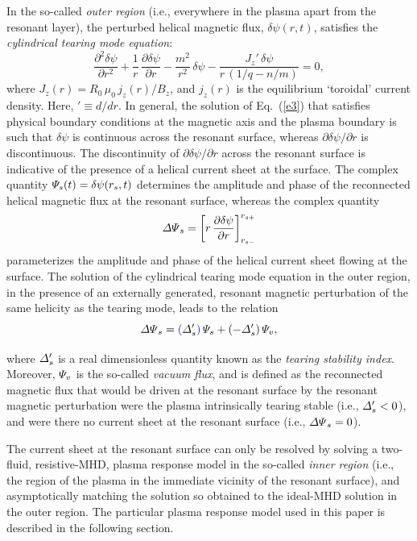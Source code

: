 \documentclass[12pt,prb,aps]{revtex4-1}
\providecommand{\DIFadd}[1]{{\protect\color{blue}\uwave{#1}}} %
\providecommand{\DIFaddbegin}{} %
\providecommand{\DIFaddend}{} %
\begin{document}
In the so-called {\em outer region}\/ (i.e., everywhere in the plasma
apart from the resonant layer), the perturbed helical magnetic flux, $\delta\psi(r,t)$, satisfies the
{\em cylindrical tearing mode equation}:\cite{wes}
\begin{equation}\label{e3}
\frac{\partial^2\delta\psi}{\partial r^2} + \frac{1}{r}\,\frac{\partial\delta\psi}{\partial r}-\frac{m^2}{r^2}\,\delta\psi - \frac{J_z'\,\delta\psi}{r\,(1/q-n/m)}=  0,
\end{equation}
where 
$J_z(r)= R_0\,\mu_0\,j_z(r)/B_z$,
and $j_z(r)$ is the equilibrium `toroidal' current density. Here, $'\equiv d/dr$. In general, the solution of Eq.~(\ref{e3}) that satisfies physical
boundary conditions at the magnetic axis and the plasma boundary is such that $\delta\psi$ is continuous
across the resonant surface, whereas $\partial\delta\psi/\partial r$ is discontinuous. The discontinuity of
 $\partial\delta\psi/\partial r$ across the resonant surface is indicative of the presence of a helical current
 sheet at the surface.  The complex quantity ${\mit\Psi}_s(t)= \delta\psi(r_s,t)$ determines the amplitude
 and phase of the reconnected helical magnetic flux at the resonant surface, whereas the complex quantity\,\cite{rf1993}
 \begin{equation}
{\mit\Delta\Psi}_s = \left[r\,\frac{\partial \delta\psi}{\partial r}\right]_{r_{s-}}^{r_{s+}}
\end{equation}
parameterizes the amplitude and phase of the helical current sheet flowing at the surface. The solution of
the cylindrical tearing mode equation in the outer region, in the presence of an externally generated, resonant magnetic perturbation 
of the same helicity as the tearing mode, leads to the relation\,\cite{rf1993,fkr}
\begin{equation}\label{e110}
{\mit\Delta\Psi}_s= \DIFaddbegin \DIFadd{(}\DIFaddend {\mit\Delta}_s'\DIFaddbegin \DIFadd{)}\DIFaddend \,{\mit\Psi}_s + (-{\mit\Delta}_s')\,{\mit\Psi}_v,
\end{equation}
where ${\mit\Delta}_s'$ is a real dimensionless quantity known as the {\em tearing stability index}. Moreover,
${\mit\Psi}_v$ is the so-called {\em vacuum flux}, and is defined as the reconnected magnetic flux
that would be driven at the resonant surface by the resonant magnetic perturbation were the
plasma intrinsically tearing stable (i.e., ${\mit\Delta}_s' <0$), and were there no current sheet at the resonant surface
(i.e., ${\mit\Delta\Psi}_s=0$).

The current sheet at the resonant surface can only be resolved by solving  a two-fluid, resistive-MHD, plasma response model
in the so-called {\em inner region}\/ (i.e., the region of the plasma in the immediate vicinity of the resonant surface), 
and asymptotically matching the solution so obtained to the ideal-MHD solution in the outer region. The particular 
plasma response model used in this paper is
described in the following section. 
\end{document}
